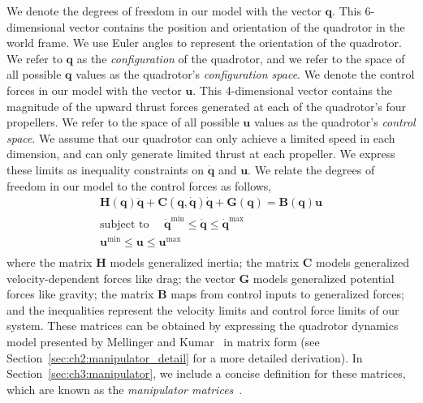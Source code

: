 We denote the degrees of freedom in our model with the vector $\mathbf{q}$.
This 6-dimensional vector contains the position and orientation of the quadrotor in the world frame.
We use Euler angles to represent the orientation of the quadrotor.
We refer to $\mathbf{q}$ as the \emph{configuration} of the quadrotor, and we refer to the space of all possible $\mathbf{q}$ values as the quadrotor's \emph{configuration space}. We denote the control forces in our model with the vector $\mathbf{u}$.
This 4-dimensional vector contains the magnitude of the upward thrust forces generated at each of the quadrotor's four propellers.
We refer to the space of all possible $\mathbf{u}$ values as the quadrotor's \emph{control space}.
We assume that our quadrotor can only achieve a limited speed in each dimension, and can only generate limited thrust at each propeller.
We express these limits as inequality constraints on $\dot{\mathbf{q}}$ and $\mathbf{u}$.
We relate the degrees of freedom in our  model to the control forces as follows,
%
\begin{equation}
\begin{aligned}
\mathbf{H}(\mathbf{q}) \ddot{\mathbf{q}} + \mathbf{C}(\mathbf{q},\dot{\mathbf{q}}) \dot{\mathbf{q}} + \mathbf{G}(\mathbf{q}) = \mathbf{B}(\mathbf{q}) \mathbf{u}\\
\text{subject to~~~~} \dot{\mathbf{q}}^{\text{min}} \leq \dot{\mathbf{q}} \leq \dot{\mathbf{q}}^{\text{max}}~~~~~~~~~\\
                      \mathbf{u}^{\text{min}}       \leq \mathbf{u}       \leq \mathbf{u}^{\text{max}}~~~~~~~~~\\
\end{aligned}
\label{eqn:ch3:manipulator}
\end{equation}
%
where
the matrix $\mathbf{H}$ models generalized inertia;
the matrix $\mathbf{C}$ models generalized velocity-dependent forces like drag;
the vector $\mathbf{G}$ models generalized potential forces like gravity;
the matrix $\mathbf{B}$ maps from control inputs to generalized forces;
and the inequalities represent the velocity limits and control force limits of our system.
These matrices can be obtained by expressing the quadrotor dynamics model presented by Mellinger and Kumar~ in matrix form (see Section~\ref{sec:ch2:manipulator_detail} for a more detailed derivation).
In Section~\ref{sec:ch3:manipulator}, we include a concise definition for these matrices, which are known as the \emph{manipulator matrices}~\cite{tedrake:2016}.

